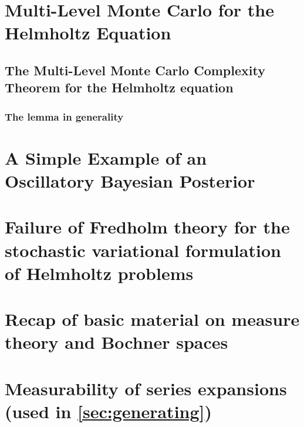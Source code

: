 \documentclass[draft]{book}
\begin{document}
\chapter{Multi-Level Monte Carlo for the Helmholtz Equation}\label{chap:mlmc}

\section{The Multi-Level Monte Carlo Complexity Theorem for the Helmholtz equation}\label{sec:comp}



\subsection{The lemma in generality}



\appendix

\chapter{A Simple Example of an Oscillatory Bayesian Posterior}\label{app:osc}


\chapter{Failure of Fredholm theory for the stochastic variational formulation of Helmholtz problems}\label{sec:federico}
 	

\chapter{Recap of basic material on measure theory and Bochner spaces}\label{app:mtBs}


\chapter{Measurability of series expansions (used in \cref{sec:generating})}\label{app:meas}




\end{document}
